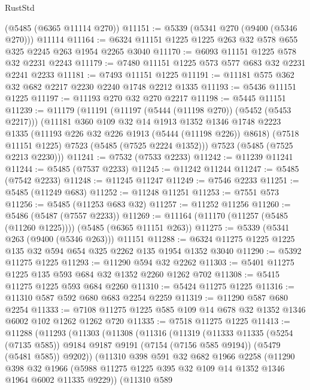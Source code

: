 \begin{lexlean}{RustStd}
\begin{coremodule}
    (@5485 (@6365 @11114 @270))
@11151 := @5339 (@5341 @270 (@9400 (@5346 @270))) @11114
@11164 := @6324 @11151 @1225 @1225 @263 @32 @578 @655 @325 @2245 @263 @1954 @2265 @3040
@11170 := @6093 @11151 @1225 @578 @32 @2231 @2243
@11179 := @7480 @11151 @1225 @573 @577 @683 @32 @2231 @2241 @2233
@11181 := @7493 @11151 @1225
@11191 := @11181 @575 @362 @32 @682 @2217 @2230 @2240 @1748 @2212 @1335
@11193 := @5436 @11151 @1225
@11197 := @11193 @270 @32 @270 @2217
@11198 := @5445 @11151
@11239 := @11179
    (@11191
      (@11197 (@5444 (@11198 @270)) (@5452 (@5453 @2217)))
      (@11181
        @360
        @109
        @32
        @14
        @1913
        @1352
        @1346
        @1748
        @2223
        @1335
        (@11193 @226 @32 @226 @1913 (@5444 (@11198 @226)) @8618)
        (@7518 @11151 @1225)
        @7523
        (@5485 (@7525 @2224 @1352)))
      @7523
      (@5485 (@7525 @2213 @2230)))
@11241 := @7532 (@7533 @2233)
@11242 := @11239 @11241
@11244 := @5485 (@7537 @2233)
@11245 := @11242 @11244
@11247 := @5485 (@7542 @2233)
@11248 := @11245 @11247
@11249 := @7546 @2233
@11251 := @5485 (@11249 @683)
@11252 := @11248 @11251
@11253 := @7551 @573
@11256 := @5485 (@11253 @683 @32)
@11257 := @11252 @11256
@11260 := @5486 (@5487 (@7557 @2233))
@11269 := @11164 (@11170 (@11257 (@5485 (@11260 @1225)))) (@5485 (@6365 @11151 @263))
@11275 := @5339 (@5341 @263 (@9400 (@5346 @263))) @11151
@11288 := @6324 @11275 @1225 @1225 @135 @32 @594 @654 @325 @2262 @135 @1954 @1352 @3040
@11290 := @5392 @11275 @1225
@11293 := @11290 @594 @32 @2262
@11303 := @5401 @11275 @1225 @135 @593 @684 @32 @1352 @2260 @1262 @702
@11308 := @5415 @11275 @1225 @593 @684 @2260
@11310 := @5424 @11275 @1225
@11316 := @11310 @587 @592 @680 @683 @2254 @2259
@11319 := @11290 @587 @680 @2254
@11333 := @7108 @11275 @1225 @585 @109 @14 @678 @32 @1352 @1346 @6002 @102 @1262 @1262 @720
@11335 := @7518 @11275 @1225
@11413 := @11288
    (@11293
      (@11303
        (@11308
          (@11316
            (@11319
              (@11333
                @11335
                (@5254 (@7135 @585))
                @9184
                @9187
                @9191
                (@7154 (@7156 @585 @9194))
                (@5479 (@5481 @585))
                @9202))
            (@11310
              @398
              @591
              @32
              @682
              @1966
              @2258
              (@11290
                @398
                @32
                @1966
                (@5988 @11275 @1225 @395 @32 @109 @14 @1352 @1346 @1964 @6002 @11335 @9229))
              (@11310
                @589

\end{coremodule}
\end{lexlean}
